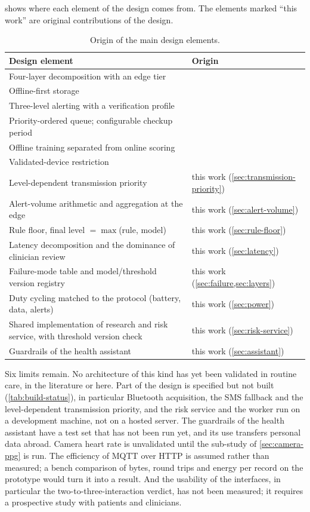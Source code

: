  shows where each element of the design comes from. The elements marked ``this work'' are original contributions of the design.

\begin{table}[htbp]
\centering\footnotesize
\caption{Origin of the main design elements.}\label{tab:traceability}
\begin{tabularx}{\textwidth}{@{}X >{\raggedright\arraybackslash}p{5.2cm}@{}}
\toprule
\textbf{Design element} & \textbf{Origin} \\
\midrule
Four-layer decomposition with an edge tier & \textcite{mucchi2021} \\
Offline-first storage & \textcite{efendi2025} \\
Three-level alerting with a verification profile & \textcite{mihevc2025} \\
Priority-ordered queue; configurable checkup period & \textcite{yazdani2018} \\
Offline training separated from online scoring & \textcite{liu2025review} \\
Validated-device restriction & \textcite{who2023hypertension} \\
Level-dependent transmission priority & this work (\cref{sec:transmission-priority}) \\
Alert-volume arithmetic and aggregation at the edge & this work (\cref{sec:alert-volume}) \\
Rule floor, final level $=\max$(rule, model) & this work (\cref{sec:rule-floor}) \\
Latency decomposition and the dominance of clinician review & this work (\cref{sec:latency}) \\
Failure-mode table and model/threshold version registry & this work (\cref{sec:failure,sec:layers}) \\
Duty cycling matched to the protocol (battery, data, alerts) & this work (\cref{sec:power}) \\
Shared implementation of research and risk service, with threshold version check & this work (\cref{sec:risk-service}) \\
Guardrails of the health assistant & this work (\cref{sec:assistant}) \\
\bottomrule
\end{tabularx}
\end{table}

Six limits remain. No architecture of this kind has yet been validated in routine care, in the literature or here. Part of the design is specified but not built (\cref{tab:build-status}), in particular Bluetooth acquisition, the SMS fallback and the level-dependent transmission priority, and the risk service and the worker run on a development machine, not on a hosted server. The guardrails of the health assistant have a test set that has not been run yet, and its use transfers personal data abroad. Camera heart rate is unvalidated until the sub-study of \cref{sec:camera-ppg} is run. The efficiency of MQTT over HTTP is assumed rather than measured; a bench comparison of bytes, round trips and energy per record on the prototype would turn it into a result. And the usability of the interfaces, in particular the two-to-three-interaction verdict, has not been measured; it requires a prospective study with patients and clinicians.
